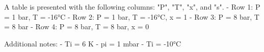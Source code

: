A table is presented with the following columns: "P", "T", "x", and "s".  
- Row 1: P = 1 bar, T = -16°C  
- Row 2: P = 1 bar, T = -16°C, x = 1  
- Row 3: P = 8 bar, T = 8 bar  
- Row 4: P = 8 bar, T = 8 bar, x = 0  

Additional notes:  
- Ti = 6 K  
- pi = 1 mbar  
- Ti = -10°C